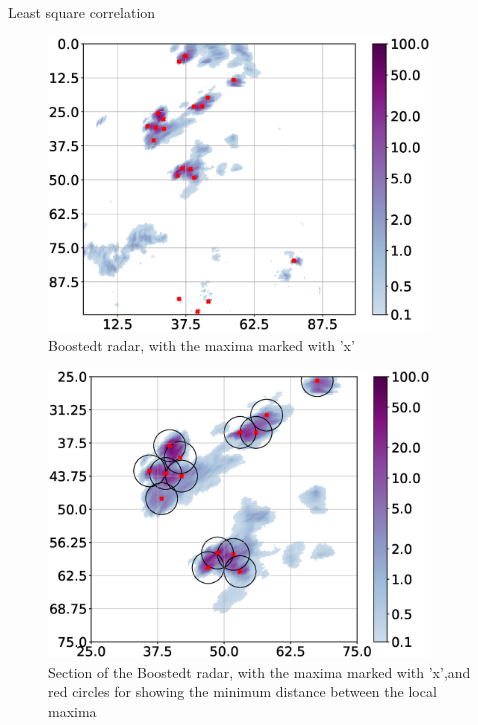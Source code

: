 \documentclass[11pt,twoside,a4paper,fleqn]{report}
\numberwithin{equation}{chapter}
\numberwithin{figure}{chapter}
\numberwithin{table}{chapter}
\begin{document}
Least square correlation
\begin{figure}[H]
	\centering
	\includegraphics[width=0.9\textwidth]{maximaOverview.eps}
	\caption{Boostedt radar, with the maxima marked with 'x'}
	\label{fig:maximaOverview}
\end{figure}
\begin{figure}[H]
	\centering
	\includegraphics[width=0.9\textwidth]{maximaOverviewZoom.eps}
	\caption{Section of the Boostedt radar, with the maxima marked with 'x',and red circles for showing the minimum distance between the local maxima}
	\label{fig:maximaOverviewZoom}
\end{figure}
\end{document}
